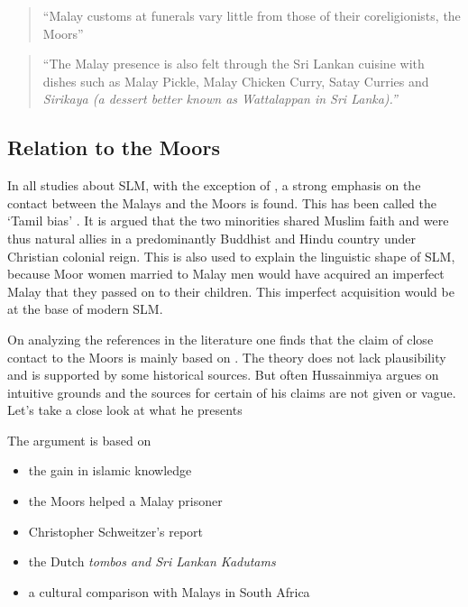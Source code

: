 \begin{quote}
    ``Malay customs at funerals vary little from those of their coreligionists, the Moors''\citet[79]{Saldin2003}
\end{quote}

\begin{quotation}
    ``The Malay presence is also felt through the Sri Lankan cuisine with dishes such as Malay Pickle, Malay Chicken Curry, Satay Curries and \em Sirikaya \em (a dessert better known as
    Wattalappan in  Sri Lanka).''\citet[12]{Jayasuriya2002}
\end{quotation}

\subsection{Relation to the Moors}\label{sec:slmbg:RelationtotheMoors}
In all studies about SLM, with the exception of
\citet{Jayasuriya2002}, a strong emphasis on the contact between
the Malays and the Moors is found. This has been called the `Tamil bias' \citep{Ansaldo2005ms}. It is argued that the two
minorities shared Muslim faith and were thus natural allies in a
predominantly Buddhist and Hindu country under Christian colonial
reign. This is also used to explain the linguistic shape of SLM,
because  Moor women married to Malay men would have acquired an
imperfect Malay that they passed on to their children. This
imperfect acquisition would be at the base of modern SLM.

On analyzing the references in the literature one finds that the claim of close contact to the Moors is mainly based on \citet{Hussainmiya1987, Hussainmiya1990}. The theory does not lack plausibility and is supported by some historical sources. But often Hussainmiya argues on intuitive grounds and the sources for certain of his claims are not given or vague. Let's take a close look at what he presents

The argument is based on

\begin{itemize}
    \item the gain in islamic knowledge
    \item the Moors helped a Malay prisoner
    \item Christopher Schweitzer's report
    \item the Dutch \em tombos \em and Sri Lankan \em Kadutams \em
    \item a cultural comparison with Malays in South Africa
\end{itemize}

